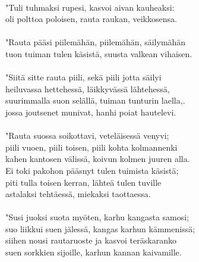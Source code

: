                                                                        \\
"Tuli tuhmaksi rupesi, kasvoi aivan kauheaksi:                         \\
oli polttoa poloisen, rauta raukan, veikkosensa.                       \\
                                                                       \\
"Rauta pääsi piilemähän, piilemähän, säilymähän                        \\
tuon tuiman tulen käsistä, suusta valkean vihaisen.                    \\
                                                                       \\
"Siitä sitte rauta piili, sekä piili jotta säilyi                      \\
heiluvassa hettehessä, läikkyvässä lähtehessä,                         \\
suurimmalla suon selällä, tuiman tunturin laella,.                     \\
jossa joutsenet munivat, hanhi poiat hautelevi.                        \\
                                                                       \\
"Rauta suossa soikottavi, veteläisessä venyvi;                         \\
piili vuoen, piili toisen, piili kohta kolmannenki                     \\
kahen kantosen välissä, koivun kolmen juuren alla.                     \\
Ei toki pakohon pääsnyt tulen tuimista käsistä;                        \\
piti tulla toisen kerran, lähteä tulen tuville                         \\
astalaksi tehtäessä, miekaksi taottaessa.                              \\
                                                                       \\
"Susi juoksi suota myöten, karhu kangasta samosi;                      \\
suo liikkui suen jälessä, kangas karhun kämmenissä;                    \\
siihen nousi rautaruoste ja kasvoi teräskaranko                        \\
suen sorkkien sijoille, karhun kannan kaivamille.                      \\
